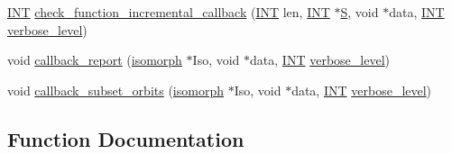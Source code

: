 \begin{DoxyCompactItemize}
\item 
\mbox{\hyperlink{galois_8h_a09fddde158a3a20bd2dcadb609de11dc}{I\+NT}} \mbox{\hyperlink{blt__set2_8_c_a87182257b04c108154aaba0054da27bf}{check\+\_\+function\+\_\+incremental\+\_\+callback}} (\mbox{\hyperlink{galois_8h_a09fddde158a3a20bd2dcadb609de11dc}{I\+NT}} len, \mbox{\hyperlink{galois_8h_a09fddde158a3a20bd2dcadb609de11dc}{I\+NT}} $\ast$\mbox{\hyperlink{simeon_8_c_adab47f8243f1b5a2c31df2535d6b37d0}{S}}, void $\ast$data, \mbox{\hyperlink{galois_8h_a09fddde158a3a20bd2dcadb609de11dc}{I\+NT}} \mbox{\hyperlink{simeon_8_c_a818073fbcc2f439e7c56952f67386122}{verbose\+\_\+level}})
\item 
void \mbox{\hyperlink{blt__set2_8_c_a7140a517d83eba77c8fdc1ba0bd2dab4}{callback\+\_\+report}} (\mbox{\hyperlink{classisomorph}{isomorph}} $\ast$Iso, void $\ast$data, \mbox{\hyperlink{galois_8h_a09fddde158a3a20bd2dcadb609de11dc}{I\+NT}} \mbox{\hyperlink{simeon_8_c_a818073fbcc2f439e7c56952f67386122}{verbose\+\_\+level}})
\item 
void \mbox{\hyperlink{blt__set2_8_c_a4eb3c34c67c16f966bdfa01443c8820a}{callback\+\_\+subset\+\_\+orbits}} (\mbox{\hyperlink{classisomorph}{isomorph}} $\ast$Iso, void $\ast$data, \mbox{\hyperlink{galois_8h_a09fddde158a3a20bd2dcadb609de11dc}{I\+NT}} \mbox{\hyperlink{simeon_8_c_a818073fbcc2f439e7c56952f67386122}{verbose\+\_\+level}})
\end{DoxyCompactItemize}


\subsection{Function Documentation}
\mbox{\label{blt__set2_8_c_a587c8e3b29cbfa22d26434fbc0a2f894}} 
